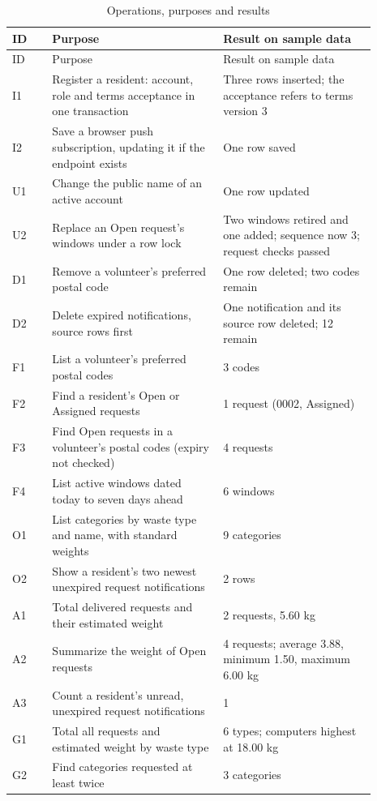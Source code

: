 \documentclass[11pt,letterpaper]{article}
\begin{document}
{\small
\begin{longtable}{@{}lL{0.47\linewidth}L{0.42\linewidth}@{}}
\caption{Operations, purposes and results}\label{tab:catalogue}\\
\toprule
ID & Purpose & Result on sample data \\
\midrule
\endfirsthead
\toprule
ID & Purpose & Result on sample data \\
\midrule
\endhead
\bottomrule
\endfoot
I1 & Register a resident: account, role and terms acceptance in one transaction & Three rows inserted; the acceptance refers to terms version 3 \\
I2 & Save a browser push subscription, updating it if the endpoint exists & One row saved \\
U1 & Change the public name of an active account & One row updated \\
U2 & Replace an Open request's windows under a row lock & Two windows retired and one added; sequence now 3; request checks passed \\
D1 & Remove a volunteer's preferred postal code & One row deleted; two codes remain \\
D2 & Delete expired notifications, source rows first & One notification and its source row deleted; 12 remain \\
F1 & List a volunteer's preferred postal codes & 3 codes \\
F2 & Find a resident's Open or Assigned requests & 1 request (0002, Assigned) \\
F3 & Find Open requests in a volunteer's postal codes (expiry not checked) & 4 requests \\
F4 & List active windows dated today to seven days ahead & 6 windows \\
O1 & List categories by waste type and name, with standard weights & 9 categories \\
O2 & Show a resident's two newest unexpired request notifications & 2 rows \\
A1 & Total delivered requests and their estimated weight & 2 requests, 5.60 kg \\
A2 & Summarize the weight of Open requests & 4 requests; average 3.88, minimum 1.50, maximum 6.00 kg \\
A3 & Count a resident's unread, unexpired request notifications & 1 \\
G1 & Total all requests and estimated weight by waste type & 6 types; computers highest at 18.00 kg \\
G2 & Find categories requested at least twice & 3 categories \\

\end{longtable}}
\end{document}
